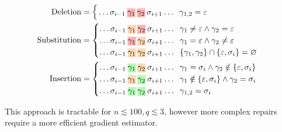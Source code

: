\documentclass[sigplan,review,anonymous,acmsmall]{acmart}\settopmatter{printfolios=false,printccs=false,printacmref=false}
\begin{document}
\begin{align*}
    \text{Deletion}&=\begin{cases}
                         \,\ldots\sigma_{i-1}\:\text{\hlred{$\gamma_1$}\:\hlred{$\gamma_2$}}\:\sigma_{i+1}\ldots\hspace{0.2cm}\gamma_{1, 2} = \varepsilon\label{eq:del}
    \end{cases}\\
    \text{Substitution}&=\begin{cases}
                             \ldots\sigma_{i-1}\:\text{\hlorange{$\gamma_1$}\:\hlred{$\gamma_2$}}\:\sigma_{i+1}\ldots\hspace{0.2cm}\gamma_1 \neq \varepsilon \land \gamma_2 = \varepsilon\\
                             \ldots\sigma_{i-1}\:\text{\hlred{$\gamma_1$}\:\hlorange{$\gamma_2$}}\:\sigma_{i+1}\ldots\hspace{0.2cm}\gamma_1 = \varepsilon \land \gamma_2 \neq \varepsilon\\
                             \ldots\sigma_{i-1}\:\text{\hlorange{$\gamma_1$}\:\hlorange{$\gamma_2$}}\:\sigma_{i+1}\ldots\hspace{0.2cm}\{\gamma_1, \gamma_2\}\cap\{\varepsilon, \sigma_i\} = \varnothing
    \end{cases}\\
    \text{Insertion}&=\begin{cases}
                          \ldots\sigma_{i-1}\:\text{\hlgreen{$\gamma_1$}\:\hlorange{$\gamma_2$}}\:\sigma_{i+1}\ldots\hspace{0.2cm}\gamma_1 = \sigma_i \land \gamma_2 \notin \{\varepsilon,  \sigma_i\}\label{eq:ins2}\\
                          \ldots\sigma_{i-1}\:\text{\hlorange{$\gamma_1$}\:\hlgreen{$\gamma_2$}}\:\sigma_{i+1}\ldots\hspace{0.2cm}\gamma_1 \notin \{\varepsilon, \sigma_i\} \land \gamma_2 = \sigma_i\label{eq:ins1}\\
                          \ldots\sigma_{i-1}\:\text{\hlgreen{$\gamma_1$}\:\hlgreen{$\gamma_2$}}\:\sigma_{i+1}\ldots\hspace{0.2cm}\gamma_{1,2} = \sigma_i\label{eq:copy}
    \end{cases}
\end{align*}

\noindent This approach is tractable for $n \lesssim 100, q \lesssim 3$, however more complex repairs require a more efficient gradient estimator.
\end{document}
